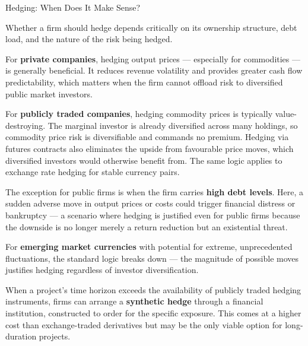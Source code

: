 \documentclass[10pt]{article}
\begin{document}
    \begin{core}{Hedging: When Does It Make Sense?}

      Whether a firm should hedge depends critically on its ownership structure, debt load, and the nature of the risk being hedged.

      For \textbf{private companies}, hedging output prices — especially for commodities — is generally beneficial. It reduces revenue volatility and provides greater cash flow predictability, which matters when the firm cannot offload risk to diversified public market investors.

      For \textbf{publicly traded companies}, hedging commodity prices is typically value-destroying. The marginal investor is already diversified across many holdings, so commodity price risk is diversifiable and commands no premium. Hedging via futures contracts also eliminates the upside from favourable price moves, which diversified investors would otherwise benefit from. The same logic applies to exchange rate hedging for stable currency pairs.

      The exception for public firms is when the firm carries \textbf{high debt levels}. Here, a sudden adverse move in output prices or costs could trigger financial distress or bankruptcy — a scenario where hedging is justified even for public firms because the downside is no longer merely a return reduction but an existential threat.

      For \textbf{emerging market currencies} with potential for extreme, unprecedented fluctuations, the standard logic breaks down — the magnitude of possible moves justifies hedging regardless of investor diversification.

      When a project's time horizon exceeds the availability of publicly traded hedging instruments, firms can arrange a \textbf{synthetic hedge} through a financial institution, constructed to order for the specific exposure. This comes at a higher cost than exchange-traded derivatives but may be the only viable option for long-duration projects.


\end{core}
\end{document}
